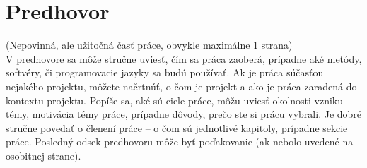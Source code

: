 \thispagestyle{empty}

\chapter*{Predhovor}

(Nepovinná, ale užitočná časť práce, obvykle maximálne 1 strana)\\

V predhovore sa môže stručne uviesť, čím sa práca zaoberá, prípadne aké metódy, softvéry, či programovacie jazyky sa budú používať. Ak je práca súčasťou nejakého projektu, môžete načrtnúť, o čom je projekt a ako je práca zaradená do kontextu projektu. Popíše sa, aké sú ciele práce, môžu uviesť okolnosti vzniku témy, motivácia témy práce, prípadne dôvody, prečo ste si prácu vybrali. Je dobré stručne povedať o členení práce -- o čom sú jednotlivé kapitoly, prípadne sekcie práce. Posledný odsek predhovoru môže byť poďakovanie (ak nebolo uvedené na osobitnej strane).

\cleardoublepage

